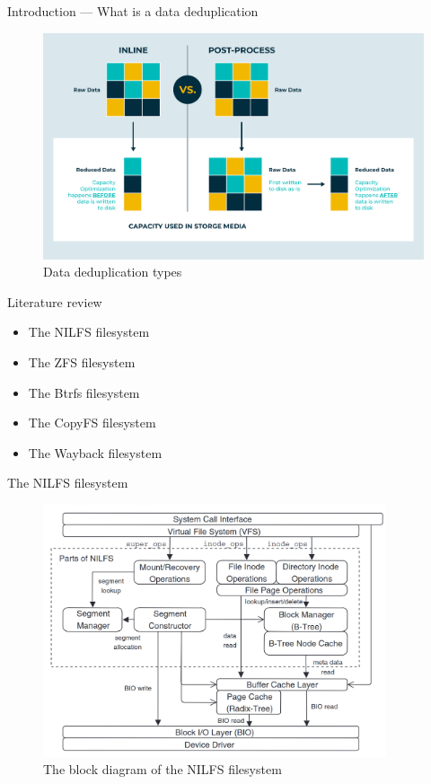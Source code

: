\documentclass[xcolor=table]{beamer}
\begin{document}
	\begin{frame}{Introduction --- What is a data deduplication}
		\begin{figure}
			\centering
			\includegraphics[width=\textwidth]{media/dedup-types.png}
			\caption{Data deduplication types}
		\end{figure}
	\end{frame}

	\begin{frame}{Literature review}
		\begin{itemize}
			\item The NILFS filesystem
			\item The ZFS filesystem
			\item The Btrfs filesystem
			\item The CopyFS filesystem
			\item The Wayback filesystem
		\end{itemize}	
	\end{frame}

	\begin{frame}{The NILFS filesystem}
		\begin{figure}
			\centering

			\includegraphics[width=0.9\textwidth]{media/nilfs.png}
			\caption{The block diagram of the NILFS filesystem }
		\end{figure}	
	\end{frame}
\end{document}
